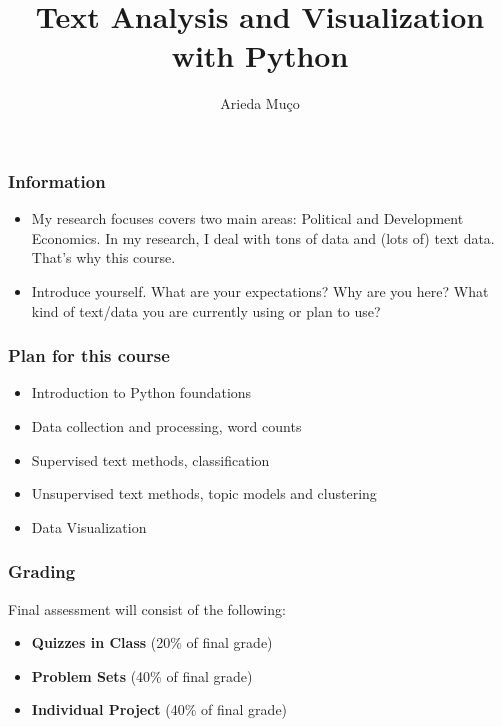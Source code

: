 \documentclass[compress, aspectratio=54]{beamer}
\title[Introduction]{Text Analysis and Visualization with Python}
\author[Arieda Mu\c co]{Arieda Mu\c co}
\institute[CEU]{Central European University}
\date{}
\begin{document}
\captionsetup[subfigure]{labelformat=empty}

\frame{\titlepage}



\begin{frame}
\frametitle{Information}
\begin{itemize}
\item My research focuses covers two main areas: Political and Development Economics. In my research, I deal with tons of data and (lots of) text data. That's why this course.
\item Introduce yourself. What are your expectations? Why are you here? What kind of text/data you are currently using or plan to use? 
\end{itemize}
\end{frame}

\begin{frame}
\frametitle{Plan for this course}
\begin{itemize}
\item Introduction to Python foundations
\item Data collection and processing, word counts
\item Supervised text methods, classification
\item Unsupervised text methods, topic models and clustering
\item Data Visualization
\end{itemize}
\end{frame}


\begin{frame}
\frametitle{Grading}
Final assessment will consist of the following:
\begin{itemize}
\item \textbf{Quizzes in Class} (20\% of final grade)
\item \textbf{Problem Sets} (40\% of final grade)
\item \textbf{Individual Project}  (40\% of final grade)
\end{itemize}
\end{frame}


\end{document}
